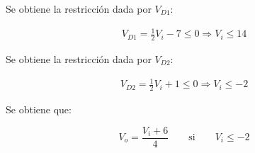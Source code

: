 Se obtiene la restricción dada por $V_{D1}$:

\begin{align*}
  V_{D1} = \frac{1}{2} V_i - 7 \leq 0
  \Rightarrow
  V_i \leq 14
\end{align*}

Se obtiene la restricción dada por $V_{D2}$:

\begin{align*}
  V_{D2} = \frac{1}{2} V_i + 1 \leq 0
  \Rightarrow
  V_i \leq -2
\end{align*}

Se obtiene que:

\begin{equation} \label{p3:offoff}
  V_o = \frac{V_i + 6}{4}
  \quad
  \quad
  \mathrm{si}
  \quad
  \quad
  V_i \leq -2
\end{equation}
